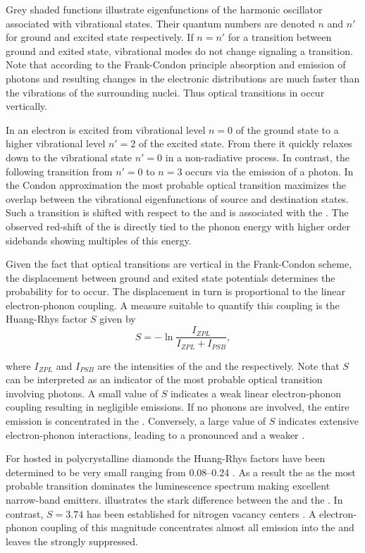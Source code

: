     Grey shaded functions illustrate eigenfunctions of the harmonic oscillator associated with vibrational states. Their quantum numbers are denoted $n$ and $n'$ for ground and excited state respectively. If $n = n'$ for a transition between ground and exited state, vibrational modes do not change signaling a \zpl transition. Note that according to the Frank-Condon principle \cite{condon1947franck} absorption and emission of photons and resulting changes in the electronic distributions are much faster than the vibrations of the surrounding nuclei. Thus optical transitions in  occur vertically. 

    In  an electron is excited from vibrational level $n=0$ of the ground state to a higher vibrational level $n'= 2$ of the excited state. From there it quickly relaxes down to the vibrational state $n' = 0$ in a non-radiative process. In contrast, the following transition from $n'=0$ to $n=3$ occurs via the emission of a photon. In the Condon approximation the most probable optical transition maximizes the overlap between the vibrational eigenfunctions of source and destination states. Such a transition is shifted with respect to the \ZPL and is associated with the \psb. The observed red-shift of the \psb is directly tied to the phonon energy with higher order sidebands showing multiples of this energy.

    Given the fact that optical transitions are vertical in the Frank-Condon scheme, the displacement between ground and exited state potentials determines the probability for \psbs to occur. The displacement in turn is proportional to the linear electron-phonon coupling. A measure suitable to quantify this coupling is the Huang-Rhys factor $S$ given by
     \begin{equation}
        S = -\ln{\frac{I_{ZPL}}{I_{ZPL} + I_{PSB}}} ,
     \end{equation}

    where $I_{ZPL}$ and $I_{PSB}$ are the intensities of the \ZPL and the \psb respectively. Note that $S$ can be interpreted as an indicator of the most probable optical transition involving photons. A small value of $S$ indicates a weak linear electron-phonon coupling resulting in negligible \psb emissions. If no phonons are involved, the entire emission is concentrated in the \zpl. Conversely, a large value of $S$ indicates extensive electron-phonon interactions, leading to a pronounced \psb and a weaker \zpl.

    For \sivs hosted in polycrystalline diamonds the Huang-Rhys factors have been determined to be very small ranging from \SIrange{0.08}{0.24}{} \cite{Duligall2006,Yuan2002,Nothaft2012}. As a result the \zpl as the most probable transition dominates the luminescence spectrum making \sivs excellent narrow-band emitters.  illustrates the stark difference between the \zpl and the \psb. In contrast, $S=3.74$ has been established for nitrogen vacancy centers \cite{Davies1981}. A electron-phonon coupling of this magnitude concentrates almost all emission into the \psb and leaves the \zpl strongly suppressed.

